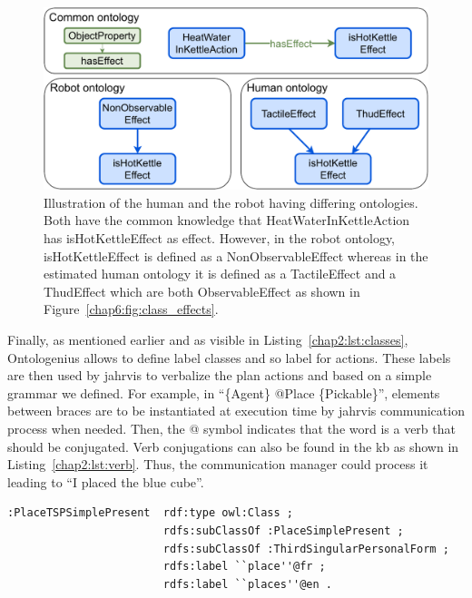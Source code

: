 \documentclass[a4paper,11pt,twoside]{StyleThese}
\begin{document}
\begin{figure}[!ht]
	\includegraphics[width=\linewidth]{figures/chapter2/kettle.pdf}
	\caption{Illustration of the human and the robot having differing ontologies. Both have the common knowledge that HeatWaterInKettleAction has isHotKettleEffect as effect. However, in the robot ontology, isHotKettleEffect is defined as a NonObservableEffect whereas in the estimated human ontology it is defined as a TactileEffect and a ThudEffect which are both ObservableEffect as shown in Figure~\ref{chap6:fig:class_effects}.}
	\label{chap6:fig:kettle}
\end{figure}

Finally, as mentioned earlier and as visible in Listing~\ref{chap2:lst:classes}, Ontologenius allows to define label classes and so label for actions. These labels are then used by \acrshort{jahrvis} to verbalize the plan actions and based on a simple grammar we defined. For example, in ``\{Agent\} @Place \{Pickable\}'', elements between braces are to be instantiated at execution time by \acrshort{jahrvis} communication process when needed. Then, the @ symbol indicates that the word is a verb that should be conjugated. Verb conjugations can also be found in the \acrshort{kb} as shown in Listing~\ref{chap2:lst:verb}. Thus, the communication manager could process it leading to ``I placed the blue cube''.

\newpage

\begin{lstlisting}[style=OwlTurtle, label={chap2:lst:verb}, caption={Description of the class describing the verb Place in the third-person present-tense, in the OWL language using the Turtle syntax.} ]
:PlaceTSPSimplePresent	rdf:type owl:Class ;
						rdfs:subClassOf :PlaceSimplePresent ;
						rdfs:subClassOf :ThirdSingularPersonalForm ;
						rdfs:label ``place''@fr ;
						rdfs:label ``places''@en .
\end{lstlisting}
\end{document}
